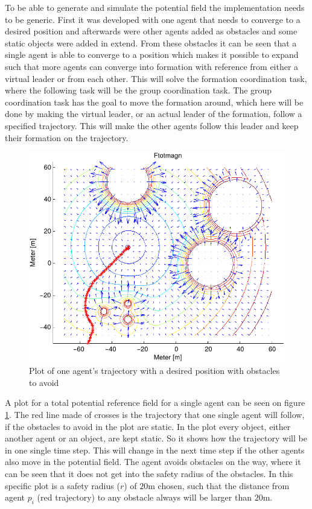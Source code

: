 \documentclass[a4paper,conference]{IEEEtran}
\begin{document}
To be able to generate and simulate the potential field the
implementation needs to be generic. First it was developed with one
agent that needs to converge to a desired position and afterwards were
other agents added as obstacles and some static objects were added in
extend. From these obstacles it can be seen that a single agent is
able to converge to a position which makes it possible to expand such
that more agents can converge into formation with reference from
either a virtual leader or from each other. This will solve the
formation coordination task, where the following task will be the
group coordination task. The group coordination task has the goal to
move the formation around, which here will be done by making the
virtual leader, or an actual leader of the formation, follow a
specified trajectory. This will make the other agents follow this
leader and keep their formation on the trajectory.

\begin{figure}[htbp]
  \includegraphics[width=.9\linewidth]{fig/ftotmagnfigpdf1}
	\caption{Plot of one agent's trajectory with a desired position with
		obstacles to avoid}
  \label{fig:potfieldagenti}
\end{figure}

A plot for a total potential reference field for a single agent can be
seen on figure \ref{fig:potfieldagenti}. The red line made of crosses
is the trajectory that one single agent will follow, if the obstacles
to avoid in the plot are static. In the plot every object, either
another agent or an object, are kept static. So it shows how the
trajectory will be in one single time step. This will change in the
next time step if the other agents also move in the potential field.
The agent avoids obstacles on the way, where it can be seen that it
does not get into the safety radius of the obstacles. In this specific
plot is a safety radius ($r$) of $20$m chosen, such that the distance
from agent $p_i$ (red trajectory) to any obstacle always will be
larger than $20$m.
\end{document}
